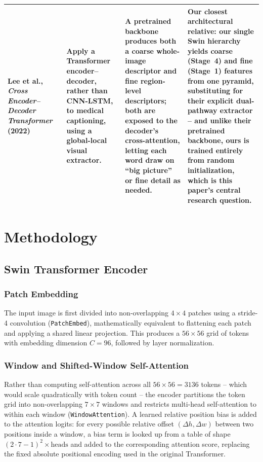 \documentclass[conference]{IEEEtran}
\begin{document}
\begin{table}[t]
\begin{tabularx}{\textwidth}{@{}p{2.3cm}X X X@{}}
Lee et al., \emph{Cross Encoder--Decoder Transformer}~\cite{lee2022cross} (2022)
&
Apply a Transformer encoder--decoder, rather than CNN-LSTM, to medical captioning, using a global-local visual extractor.
&
A pretrained backbone produces both a coarse whole-image descriptor and fine region-level descriptors; both are exposed to the decoder's cross-attention, letting each word draw on ``big picture'' or fine detail as needed.
&
Our closest architectural relative: our single Swin hierarchy yields coarse (Stage~4) and fine (Stage~1) features from one pyramid, substituting for their explicit dual-pathway extractor -- and unlike their pretrained backbone, ours is trained entirely from random initialization, which is this paper's central research question. \\

\bottomrule
\end{tabularx}
\end{table}

\section{Methodology}
\label{sec:method}

\subsection{Swin Transformer Encoder}
\label{sec:method-encoder}

\subsubsection{Patch Embedding}
The input image is first divided into non-overlapping $4\times4$ patches using a stride-4 convolution (\texttt{PatchEmbed}), mathematically equivalent to flattening each patch and applying a shared linear projection. This produces a $56\times56$ grid of tokens with embedding dimension $C=96$, followed by layer normalization.

\subsubsection{Window and Shifted-Window Self-Attention}
Rather than computing self-attention across all $56\times56=3136$ tokens -- which would scale quadratically with token count -- the encoder partitions the token grid into non-overlapping $7\times7$ windows and restricts multi-head self-attention to within each window (\texttt{WindowAttention}). A learned relative position bias is added to the attention logits: for every possible relative offset $(\Delta h, \Delta w)$ between two positions inside a window, a bias term is looked up from a table of shape $(2\cdot7-1)^2 \times \text{heads}$ and added to the corresponding attention score, replacing the fixed absolute positional encoding used in the original Transformer.
\end{document}
